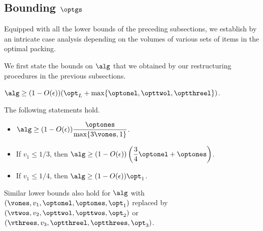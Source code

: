 \subsection{Bounding \texorpdfstring{$\optgs$}{optgs}}
\label{subsec:bound}
Equipped with all the lower bounds of the preceding subsections, we establish  by an intricate case analysis depending on the volumes of various sets of items in the optimal packing. 




\mainlemma*

We first state the bounds on $\alg$ that we obtained by our restructuring procedures in the previous subsections.

\structuredpackingalgo*

\begin{corollary}
\label{thm:big&largealgo}
    $\alg \ge (1-O(\epsilon))(\opt_L + \max \{\optonel, \opttwol, \optthreel\})$.
\end{corollary}

\begin{corollary}
\label{cor:packingI1}
    The following statements hold.
    \begin{itemize}
        \item $\alg \ge (1-O(\epsilon))\displaystyle\frac{\optones}{\max\{3\vones,1\}}$.
        \item If $v_1 \le 1/3$, then $\displaystyle\alg \ge (1-O(\epsilon))\left(\frac{3}{4}\optonel + \optones\right)$.
        \item If $v_1 \le 1/4$, then $\alg \ge (1-O(\epsilon))\opt_1$.
    \end{itemize}
    Similar lower bounds also hold for $\alg$ with $(\vones,v_1,\optonel,\optones,\opt_1)$ replaced by \newline \noindent $(\vtwos,v_2,\opttwol,\opttwos,\opt_2)$ or $(\vthrees,v_3,\optthreel,\optthrees,\opt_3)$.
\end{corollary}

